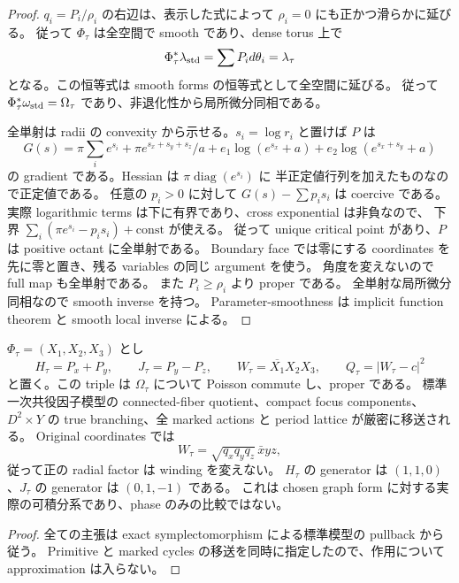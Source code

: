 \begin{proof}
$q_i=P_i/\rho_i$ の右辺は、表示した式によって $\rho_i=0$ にも正かつ滑らかに延びる。
従って $\Phi_\tau$ は全空間で smooth であり、dense torus 上で
\[
 \Phi_\tau^*\lambda_{\rm std}=\sum P_i d\theta_i=\lambda_\tau
\]
となる。この恒等式は smooth forms の恒等式として全空間に延びる。
従って $\Phi_\tau^*\omega_{\rm std}=\Omega_\tau$ であり、非退化性から局所微分同相である。

全単射は radii の convexity から示せる。$s_i=\log r_i$ と置けば $P$ は
\[
 G(s)=\pi\sum_i e^{s_i}+\pi e^{s_x+s_y+s_z}/a
       +e_1\log(e^{s_x}+a)+e_2\log(e^{s_x+s_y}+a)
\]
の gradient である。Hessian は $\pi\operatorname{diag}(e^{s_i})$ に
半正定値行列を加えたものなので正定値である。
任意の $p_i>0$ に対して $G(s)-\sum p_i s_i$ は coercive である。
実際 logarithmic terms は下に有界であり、cross exponential は非負なので、
下界 $\sum_i(\pi e^{s_i}-p_i s_i)+\mathrm{const}$ が使える。
従って unique critical point があり、$P$ は positive octant に全単射である。
Boundary face では零にする coordinates を先に零と置き、残る variables の同じ argument を使う。
角度を変えないので full map も全単射である。
また $P_i\ge\rho_i$ より proper である。
全単射な局所微分同相なので smooth inverse を持つ。
Parameter-smoothness は implicit function theorem と smooth local inverse による。
\end{proof}

\begin{corollary}
$\Phi_\tau=(X_1,X_2,X_3)$ とし
\[
 H_\tau=P_x+P_y,\qquad J_\tau=P_y-P_z,\qquad
 W_\tau=\overline{X_1}X_2X_3,
 \qquad Q_\tau=|W_\tau-c|^2
\]
と置く。この triple は $\Omega_\tau$ について Poisson commute し、proper である。
標準一次共役因子模型の connected-fiber quotient、compact focus components、
$D^2\times Y$ の true branching、全 marked actions と period lattice が厳密に移送される。
Original coordinates では
\[
 W_\tau=\sqrt{q_xq_yq_z}\,\bar x yz,
\]
従って正の radial factor は winding を変えない。
$H_\tau$ の generator は $(1,1,0)$、$J_\tau$ の generator は $(0,1,-1)$ である。
これは chosen graph form に対する実際の可積分系であり、phase のみの比較ではない。
\end{corollary}

\begin{proof}
全ての主張は exact symplectomorphism による標準模型の pullback から従う。
Primitive と marked cycles の移送を同時に指定したので、作用について approximation は入らない。
\end{proof}

